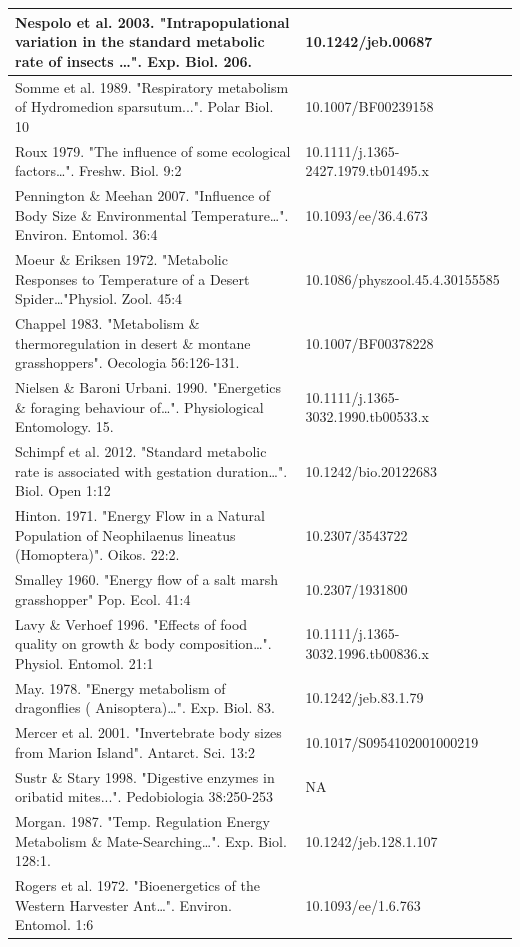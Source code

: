 \documentclass{article}
\begin{document}
\begin{table}[h]
\begin{tabular}{|l|l|}
Nespolo et al. 2003.   "Intrapopulational variation in the standard metabolic rate of insects …". Exp. Biol. 206. & 10.1242/jeb.00687 \\ \hline
Somme et al. 1989. "Respiratory  metabolism of Hydromedion sparsutum...".   Polar Biol. 10 & 10.1007/BF00239158 \\ \hline
Roux 1979. "The influence of some  ecological factors…". Freshw. Biol.   9:2 & 10.1111/j.1365-2427.1979.tb01495.x \\ \hline
Pennington \& Meehan 2007.   "Influence of Body Size \& Environmental Temperature…". Environ.   Entomol. 36:4 & 10.1093/ee/36.4.673 \\ \hline
Moeur \& Eriksen 1972. "Metabolic Responses to Temperature of a Desert Spider…"Physiol. Zool. 45:4 & 10.1086/physzool.45.4.30155585 \\ \hline
Chappel 1983. "Metabolism \& thermoregulation in desert \& montane grasshoppers". Oecologia  56:126-131. & 10.1007/BF00378228 \\ \hline
Nielsen \& Baroni Urbani. 1990.  "Energetics \& foraging behaviour of…".   Physiological Entomology. 15. & 10.1111/j.1365-3032.1990.tb00533.x \\ \hline
Schimpf et al. 2012. "Standard   metabolic rate is associated with gestation duration…". Biol. Open 1:12 & 10.1242/bio.20122683 \\ \hline
Hinton. 1971. "Energy Flow in a   Natural Population of Neophilaenus lineatus (Homoptera)". Oikos. 22:2. & 10.2307/3543722 \\ \hline
Smalley 1960. "Energy flow of a salt   marsh grasshopper" Pop. Ecol. 41:4 & 10.2307/1931800 \\ \hline
Lavy \& Verhoef 1996. "Effects of   food quality on growth \& body composition…". Physiol. Entomol. 21:1 & 10.1111/j.1365-3032.1996.tb00836.x \\ \hline
May. 1978. "Energy metabolism of   dragonflies ( Anisoptera)…". Exp. Biol. 83. & 10.1242/jeb.83.1.79 \\ \hline
Mercer et al. 2001. "Invertebrate   body sizes from Marion Island". Antarct. Sci. 13:2 & 10.1017/S0954102001000219 \\ \hline
Sustr \& Stary 1998. "Digestive   enzymes in oribatid mites...". Pedobiologia 38:250-253 & NA \\ \hline
Morgan. 1987. "Temp. Regulation   Energy Metabolism \& Mate-Searching…". Exp. Biol. 128:1. & 10.1242/jeb.128.1.107 \\ \hline
Rogers et al. 1972. "Bioenergetics   of the Western Harvester Ant…". Environ. Entomol. 1:6 & 10.1093/ee/1.6.763 \\ \hline

\end{tabular}
\end{table}
\end{document}
